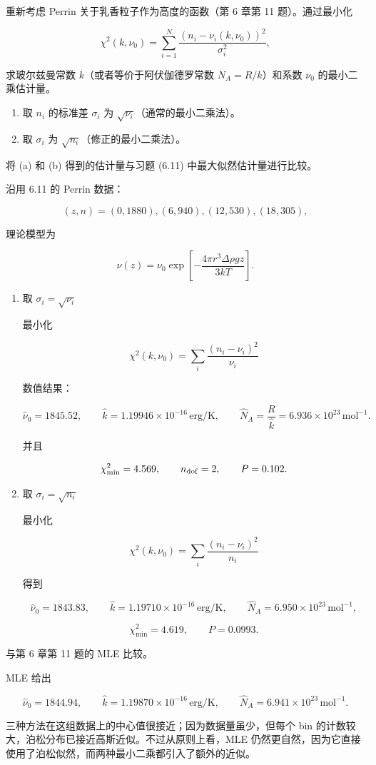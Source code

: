 \begin{question}
重新考虑 Perrin 关于乳香粒子作为高度的函数（第 6 章第 11 题）。通过最小化

\[
\chi^2(k,\nu_0)=\sum_{i=1}^{N}\frac{(n_i-\nu_i(k,\nu_0))^2}{\sigma_i^2},
\]

求玻尔兹曼常数 \(k\)（或者等价于阿伏伽德罗常数 \(N_A=R/k\)）和系数
\(\nu_0\) 的最小二乘估计量。

\begin{enumerate}
\item
  取 \(n_i\) 的标准差 \(\sigma_i\) 为
  \(\sqrt{\nu_i}\)（通常的最小二乘法）。
\item
  取 \(\sigma_i\) 为 \(\sqrt{n_i}\)（修正的最小二乘法）。
\end{enumerate}

将 (a) 和 (b) 得到的估计量与习题 (6.11) 中最大似然估计量进行比较。
\begin{solution}
沿用 6.11 的 Perrin 数据：

\[
(z, n)= (0,1880),(6,940),(12,530),(18,305),
\]

理论模型为

\[
\nu(z)=\nu_0\exp\!\left[-\frac{4\pi r^3\Delta\rho g z}{3kT}\right].
\]

\begin{enumerate}
\item 取 \(\sigma_i=\sqrt{\nu_i}\)

最小化

\[
\chi^2(k,\nu_0)=\sum_i\frac{(n_i-\nu_i)^2}{\nu_i}
\]

数值结果：

\[
\hat\nu_0=1845.52,
\qquad
\hat k=1.19946\times10^{-16}\,\mathrm{erg/K},
\qquad
\hat N_A=\frac{R}{\hat k}=6.936\times10^{23}\,\mathrm{mol}^{-1}.
\]

并且

\[
\chi^2_{\min}=4.569,
\qquad
n_{\rm dof}=2,
\qquad
P=0.102.
\]

\item 取 \(\sigma_i=\sqrt{n_i}\)

最小化

\[
\chi^2(k,\nu_0)=\sum_i\frac{(n_i-\nu_i)^2}{n_i}
\]

得到

\[
\hat\nu_0=1843.83,
\qquad
\hat k=1.19710\times10^{-16}\,\mathrm{erg/K},
\qquad
\hat N_A=6.950\times10^{23}\,\mathrm{mol}^{-1},
\]

\[
\chi^2_{\min}=4.619,
\qquad
P=0.0993.
\]

\end{enumerate}

与第 6 章第 11 题的 MLE 比较。

MLE 给出

\[
\hat\nu_0=1844.94,
\qquad
\hat k=1.19870\times10^{-16}\,\mathrm{erg/K},
\qquad
\hat N_A=6.941\times10^{23}\,\mathrm{mol}^{-1}.
\]

三种方法在这组数据上的中心值很接近；因为数据量虽少，但每个 bin
的计数较大，泊松分布已接近高斯近似。不过从原则上看，MLE
仍然更自然，因为它直接使用了泊松似然，而两种最小二乘都引入了额外的近似。
\end{solution}
\end{question}

